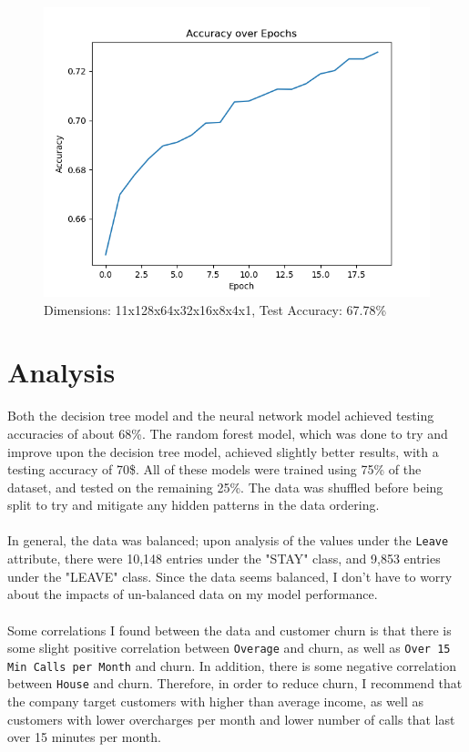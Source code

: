 \documentclass[12pt, notitlepage]{article}
\begin{document}
\begin{figure}[H]
	\centering
	\includegraphics[scale=0.6]{neuralnet3.png}
	\caption{Dimensions: 11x128x64x32x16x8x4x1, Test Accuracy: 67.78\%}
\end{figure}

\section{Analysis}
Both the decision tree model and the neural network model achieved testing accuracies of about 68\%. The random forest model, which was done to try and improve upon the decision tree model, achieved slightly better results, with a testing accuracy of 70\$. All of these models were trained using 75\% of the dataset, and tested on the remaining 25\%. The data was shuffled before being split to try and mitigate any hidden patterns in the data ordering. \\\\
In general, the data was balanced; upon analysis of the values under the \texttt{Leave} attribute, there were 10,148 entries under the "STAY" class, and 9,853 entries under the "LEAVE" class. Since the data seems balanced, I don't have to worry about the impacts of un-balanced data on my model performance.\\\\
Some correlations I found between the data and customer churn is that there is some slight positive correlation between \texttt{Overage} and churn, as well as \texttt{Over 15 Min Calls per Month} and churn. In addition, there is some negative correlation between \texttt{House} and churn. Therefore, in order to reduce churn, I recommend that the company target customers with higher than average income, as well as customers with lower overcharges per month and lower number of calls that last over 15 minutes per month.
\end{document}
